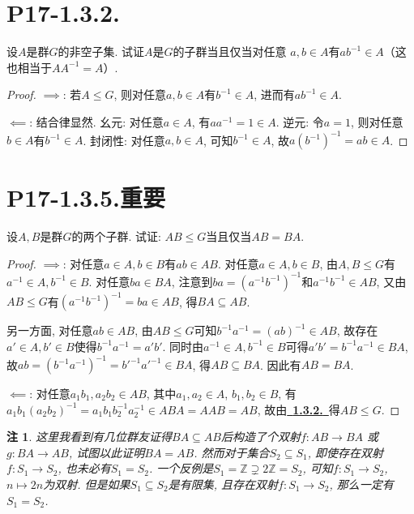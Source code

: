 \documentclass[12pt, a4paper, fontset=windows]{ctexart}
\newcommand{\Z}{\mathbb{Z}}
\newcommand{\kh}[1]{（{#1}）} %
\newcommand{\myref}[2][]{\hyperref[#1]{\color{blue}\ {#2}\ }}
\newtheorem*{remark}{注}
\begin{document}
\section*{P17-1.3.2.}
\label{subgroup}

设$A$是群$G$的非空子集. 试证$A$是$G$的子群当且仅当对任意
$a,b\in A$有$ab^{-1}\in A$\kh{这也相当于$AA^{-1}=A$}. 

\begin{proof}
$\implies$: 
若$A\le G$, 则对任意$a,b\in A$有$b^{-1}\in A$, 进而有$ab^{-1}\in A$. 

$\impliedby$: 
结合律显然. 
幺元: 对任意$a\in A$, 有$aa^{-1}=1\in A$. 
逆元: 令$a=1$, 则对任意$b\in A$有$b^{-1}\in A$. 
封闭性: 对任意$a,b\in A$, 可知$b^{-1}\in A$, 
故$a(b^{-1})^{-1}=ab\in A$. 
\end{proof}

\section*{P17-1.3.5.\normalsize 重要}

设$A,B$是群$G$的两个子群. 试证: $AB\le G$当且仅当$AB=BA$. 

\begin{proof}
$\implies$: 对任意$a\in A,b\in B$有$ab\in AB$. 对任意$a\in A,b\in B$, 
由$A,B\le G$有$a^{-1}\in A,b^{-1}\in B$. 对任意$ba\in BA$, 
注意到$ba=(a^{-1}b^{-1})^{-1}$和$a^{-1}b^{-1}\in AB$, 
又由$AB\le G$有$(a^{-1}b^{-1})^{-1}=ba\in AB$, 得$BA\subseteq AB$. 

另一方面, 对任意$ab\in AB$, 由$AB\le G$可知$b^{-1}a^{-1}=
(ab)^{-1}\in AB$, 故存在$a'\in A,b'\in B$使得$b^{-1}a^{-1}=a'b'$. 
同时由$a^{-1}\in A,b^{-1}\in B$可得$a'b'=b^{-1}a^{-1}\in BA$,
故$ab=(b^{-1}a^{-1})^{-1}=b'^{-1}a'^{-1}\in BA$, 得$AB\subseteq BA$. 
因此有$AB=BA$. 

$\impliedby$: 对任意$a_1b_1,a_2b_2\in AB$, 其中$a_1,a_2\in A$, $b_1,b_2\in B$, 
有$a_1b_1(a_2b_2)^{-1}=a_1b_1b_2^{-1}a_2^{-1}\in ABA=AAB=AB$, 
故由\myref[subgroup]{\bf 1.3.2.}得$AB\le G$. 
\end{proof}

\begin{remark}
这里我看到有几位群友证得$BA\subseteq AB$后构造了个双射$f:AB\to BA$
或$g:BA\to AB$, 试图以此证明$BA=AB$. 然而对于集合$S_2\subseteq S_1$, 
即使存在双射$f:S_1\to S_2$, 也未必有$S_1=S_2$. 一个反例是$S_1=\Z\supsetneq 2\Z=S_2$, 
可知$f:S_1\to S_2$, $n\mapsto 2n$为双射. 但是如果$S_1\subseteq S_2$是有限集, 
且存在双射$f:S_1\to S_2$, 那么一定有$S_1=S_2$. 
\end{remark}
\end{document}
